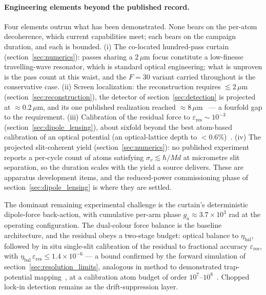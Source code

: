 \documentclass[11pt,a4paper]{article}
\begin{document}
\paragraph{Engineering elements beyond the published record.} Four elements outrun what has been demonstrated. None bears on the per-atom decoherence, which current capabilities meet; each bears on the campaign duration, and each is bounded. (i) The co-located hundred-pass curtain (section~\ref{sec:numerics}): passes sharing a $2\,\mu$m focus constitute a low-finesse travelling-wave resonator, which is standard optical engineering; what is unproven is the pass count at this waist, and the $F = 30$ variant carried throughout is the conservative case. (ii) Screen localization: the reconstruction requires $\lesssim 2\,\mu$m (section~\ref{sec:reconstruction}), the detector of section~\ref{sec:detection} is projected at $\approx 0.2\,\mu$m, and its one published realization reached $\approx 8\,\mu$m~\cite{Bucker2009} --- a fourfold gap to the requirement. (iii) Calibration of the residual force to $\varepsilon_\text{res} \sim 10^{-3}$ (section~\ref{sec:dipole_lensing}), about sixfold beyond the best atom-based calibration of an optical potential (an optical-lattice depth to $< 0.6\%$)~\cite{Bertoldi2010, Zhou2018}. (iv) The projected slit-coherent yield (section~\ref{sec:numerics}): no published experiment reports a per-cycle count of atoms satisfying $\sigma_v \lesssim \hbar/Md$ at micrometre slit separation, so the duration scales with the yield a source delivers. These are apparatus development items, and the reduced-power commissioning phase of section~\ref{sec:dipole_lensing} is where they are settled.

The dominant remaining experimental challenge is the curtain's deterministic dipole-force back-action, with cumulative per-arm phase $g_a \approx 3.7\times 10^3$ rad at the operating configuration. The dual-colour force balance is the baseline architecture, and the residual obeys a two-stage budget: optical balance to $\eta_\text{bal}$, followed by in situ single-slit calibration of the residual to fractional accuracy $\varepsilon_\text{res}$, with $\eta_\text{bal}\,\varepsilon_\text{res} \leq 1.4\times 10^{-6}$ --- a bound confirmed by the forward simulation of section~\ref{sec:resolution_limits}, analogous in method to demonstrated trap-potential mapping~\cite{Bertoldi2010, Xu2024}, at a calibration atom budget of order $10^7$--$10^8$~\cite{Kim2023}. Chopped lock-in detection remains as the drift-suppression layer.
\end{document}
